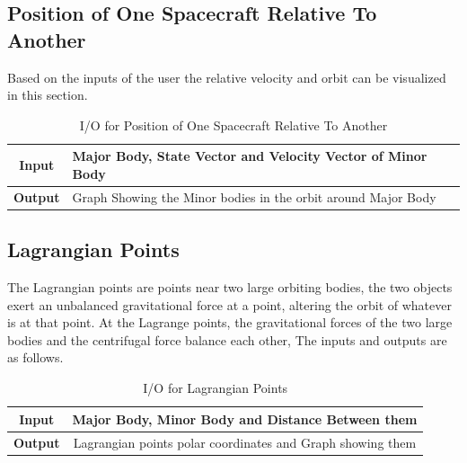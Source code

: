 \subsection{Position of One Spacecraft Relative To Another}
Based on the inputs of the user the relative velocity and orbit can be visualized in this section.
\begin{table}[H]
\begin{tabular}{@{}cl@{}}
\toprule
\textbf{Input}  & Major Body, State Vector and Velocity Vector of Minor Body    \\ \midrule
\textbf{Output} & Graph Showing the Minor bodies in the orbit around Major Body \\ \bottomrule
\end{tabular}\caption{I/O for Position of One Spacecraft Relative To Another}
\end{table}
\subsection{Lagrangian Points}
The Lagrangian points are points near two large orbiting bodies, the two objects exert an unbalanced gravitational force at a point, altering the orbit of whatever is at that point. At the Lagrange points, the gravitational forces of the two large bodies and the centrifugal force balance each other, The inputs and outputs are as follows.
\begin{table}[H]
\begin{tabular}{@{}cc@{}}
\toprule
\textbf{Input}  & Major Body, Minor Body and Distance Between them           \\ \midrule
\textbf{Output} & Lagrangian points polar coordinates and Graph showing them \\ \bottomrule
\end{tabular}\caption{I/O for Lagrangian Points}
\end{table}